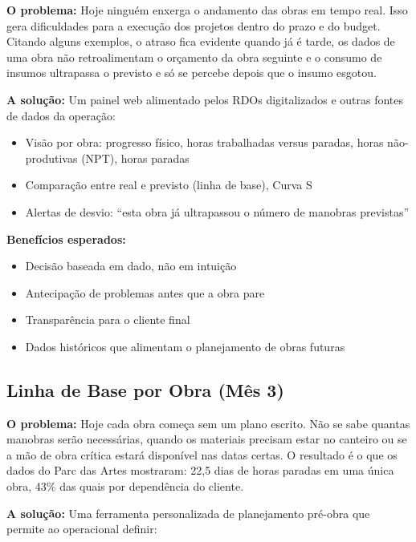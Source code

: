 \documentclass[12pt,a4paper]{scrartcl}
\begin{document}
\textbf{O problema:} Hoje ninguém enxerga o andamento das obras em tempo real. Isso gera dificuldades para a execução dos projetos dentro do prazo e do budget. Citando alguns exemplos, o atraso fica evidente quando já é tarde, os dados de uma obra não retroalimentam o orçamento da obra seguinte e o consumo de insumos ultrapassa o previsto e só se percebe depois que o insumo esgotou.

\textbf{A solução:} Um painel web alimentado pelos RDOs digitalizados e outras fontes de dados da operação:

\begin{itemize}
  \item Visão por obra: progresso físico, horas trabalhadas versus paradas, horas não-produtivas (NPT), horas paradas
  \item Comparação entre real e previsto (linha de base), Curva S
  \item Alertas de desvio: ``esta obra já ultrapassou o número de manobras previstas''
\end{itemize}

\textbf{Benefícios esperados:}
\begin{itemize}
  \item Decisão baseada em dado, não em intuição
  \item Antecipação de problemas antes que a obra pare
  \item Transparência para o cliente final
  \item Dados históricos que alimentam o planejamento de obras futuras
\end{itemize}

\subsection{Linha de Base por Obra (Mês 3)}

\textbf{O problema:} Hoje cada obra começa sem um plano escrito. Não se sabe quantas manobras serão necessárias, quando os materiais precisam estar no canteiro ou se a mão de obra crítica estará disponível nas datas certas. O resultado é o que os dados do Parc das Artes mostraram: 22,5 dias de horas paradas em uma única obra, 43\% das quais por dependência do cliente.

\textbf{A solução:} Uma ferramenta personalizada de planejamento pré-obra que permite ao operacional definir:
\end{document}
